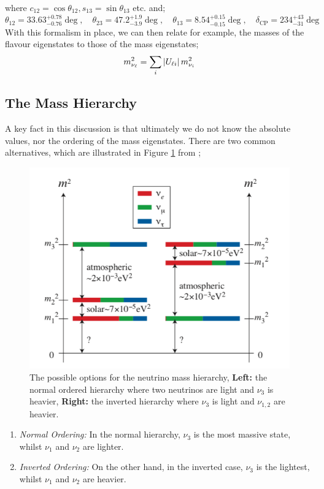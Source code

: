 \documentclass[10pt]{article}
\begin{document}
where $c_{12} = \cos\theta_{12}, s_{13} = \sin\theta_{13}$ etc. and;
\begin{equation}
  \theta_{12} = 33.63^{+0.78}_{-0.76}\deg, \quad \theta_{23} = 47.2^{+1.9}_{-3.9}\deg, \quad \theta_{13} = 8.54^{+0.15}_{-0.15}\deg, \quad \delta_{\textrm{CP}} = 234^{+43}_{-31}\deg
\end{equation}
With this formalism in place, we can then relate for example, the masses of the flavour eigenstates to those of the mass eigenstates;
\begin{equation}
  m_{\nu_\ell}^2 = \sum_{i}{\left| U_{\ell i} \right|m_{\nu_i}^2}
\end{equation}
\subsection{The Mass Hierarchy}
A key fact in this discussion is that ultimately we do not know the absolute values, nor the ordering of the mass eigenstates. There are two common alternatives, which are illustrated in Figure \ref{fig:hierarchy} from \cite{King};
\begin{figure}[h]
  \begin{framed}
  \centering
  \includegraphics[width=0.5\linewidth]{mass_hierarchy}
  \caption{The possible options for the neutrino mass hierarchy, \textbf{Left:} the normal ordered hierarchy where two neutrinos are light and $\nu_3$ is heavier, \textbf{Right:} the inverted hierarchy where $\nu_3$ is light and $\nu_{1,2}$ are heavier.}
  \label{fig:hierarchy}
  \end{framed}
\end{figure}
\begin{enumerate}
  \item \textit{Normal Ordering:} In the normal hierarchy, $\nu_3$ is the most massive state, whilst $\nu_1$ and $\nu_2$ are lighter.
  \item \textit{Inverted Ordering:} On the other hand, in the inverted case, $\nu_3$ is the lightest, whilst $\nu_1$ and $\nu_2$ are heavier.
\end{enumerate}
\end{document}
